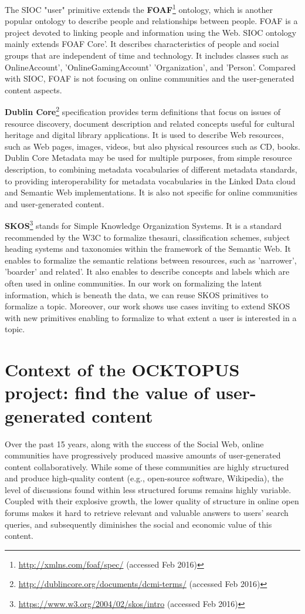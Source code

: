 The SIOC "user" primitive extends the \textbf{FOAF}\footnote{\url{http://xmlns.com/foaf/spec/} (accessed Feb 2016)} ontology, which is another popular ontology to describe people and relationships between people. FOAF is a project devoted to linking people and information using the Web. SIOC ontology mainly extends FOAF Core'. It describes characteristics of people and social groups that are independent of time and technology. It includes classes such as OnlineAccount', 'OnlineGamingAccount' 'Organization', and 'Person'. Compared with SIOC, FOAF is not focusing on online communities and the user-generated content aspects. 
 
\textbf{Dublin Core}\footnote{\url{http://dublincore.org/documents/dcmi-terms/} (accessed Feb 2016)} specification provides term definitions that focus on issues of resource discovery, document description and related concepts useful for cultural heritage and digital library applications. It is used to describe Web resources, such as Web pages, images, videos, but also physical resources such as CD, books. Dublin Core Metadata may be used for multiple purposes, from simple resource description, to combining metadata vocabularies of different metadata standards, to providing interoperability for metadata vocabularies in the Linked Data cloud and Semantic Web implementations. It is also not specific for online communities and user-generated content.

\textbf{SKOS}\footnote{\url{https://www.w3.org/2004/02/skos/intro} (accessed Feb 2016)} stands for Simple Knowledge Organization Systems. It is a standard recommended by the W3C to formalize thesauri, classification schemes, subject heading systems and taxonomies within the framework of the Semantic Web. It enables to formalize the semantic relations between resources, such as 'narrower', 'boarder' and related'. It also enables to describe concepts and labels which are often used in online communities. 
In our work on formalizing the latent information, which is beneath the data, we can reuse SKOS primitives to formalize a topic. Moreover, our work shows use cases inviting to extend SKOS with new primitives enabling to formalize to what extent a user is interested in a topic.

 
\section{Context of the OCKTOPUS project: find the value of user-generated content}
Over the past 15 years, along with the success of the Social Web, online communities have progressively produced massive amounts of user-generated content collaboratively.
While some of these communities are highly structured and produce high-quality content (e.g., open-source software, Wikipedia), the level of discussions found within less structured forums remains highly variable. Coupled with their explosive growth, the lower quality of structure in online open forums makes it hard to retrieve relevant and valuable answers to users' search queries, and subsequently diminishes the social and economic value of this content.

